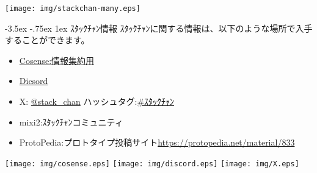 \documentclass[notumble,combine]{leaflet}
\makeatletter
\renewcommand\section{\@startsection{section}{1}{\z@}%
  {-3.5ex \@plus -.75ex}%
  {1ex} %
  {\normalfont\Large\sectfont\color{NavyBlue}\addul}}
\newcommand{\addul}[1]{\underline{#1}}
\makeatother
\begin{document}
\texttt{[image: img/stackchan-many.eps]}
\vfill
\begin{minipage}{\textwidth}
\begin{boxnote}

\section{ｽﾀｯｸﾁｬﾝ情報}
ｽﾀｯｸﾁｬﾝに関する情報は、以下のような場所で入手することができます。

\begin{itemize}
  \item \href{https://scrapbox.io/stack-chan/}{Cosense:情報集約用}
  \item \href{https://discord.gg/eGhd9adnBm}{Dicsord}
  \item X:
	\href{https://x.com/stack_chan}{@stack\_chan}
	ハッシュタグ:\href{https://x.com/search?q=%23%EF%BD%BD%EF%BE%80%EF%BD%AF%EF%BD%B8%EF%BE%81%EF%BD%AC%EF%BE%9D&src=typed_query&f=live}{\#ｽﾀｯｸﾁｬﾝ}
  \item mixi2:ｽﾀｯｸﾁｬﾝコミュニティ
  \item ProtoPedia:プロトタイプ投稿サイト\url{https://protopedia.net/material/833}
\end{itemize}

\texttt{[image: img/cosense.eps]}
\texttt{[image: img/discord.eps]}
\texttt{[image: img/X.eps]}

\end{boxnote}
\end{minipage}
\end{document}
